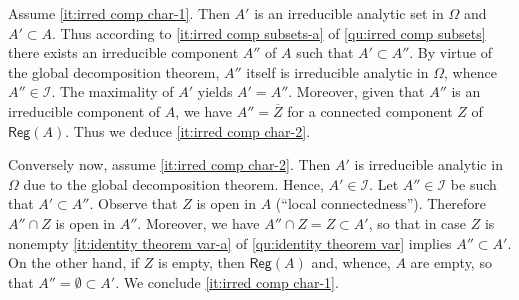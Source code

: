 \documentclass[a4paper]{amsart}
\newcommand{\C}{\mathbb{C}}
\newcommand{\Reg}[1]{\mathsf{Reg}(#1)}
\theoremstyle{remark}
\numberwithin{equation}{question}
\begin{document}
\begin{solution}
Assume \cref{it:irred comp char-1}. Then $A'$ is an irreducible analytic set in $\Omega$ and $A' \subset A$. Thus according to \cref{it:irred comp subsets-a} of \cref{qu:irred comp subsets} there exists an irreducible component $A''$ of $A$ such that $A' \subset A''$. By virtue of the global decomposition theorem, $A''$ itself is irreducible analytic in $\Omega$, whence $A'' \in \mathcal I$. The maximality of $A'$ yields $A' = A''$. Moreover, given that $A''$ is an irreducible component of $A$, we have $A'' = \overline Z$ for a connected component $Z$ of $\Reg A$. Thus we deduce \cref{it:irred comp char-2}.

Conversely now, assume \cref{it:irred comp char-2}. Then $A'$ is irreducible analytic in $\Omega$ due to the global decomposition theorem. Hence, $A' \in \mathcal I$. Let $A'' \in \mathcal I$ be such that $A' \subset A''$. Observe that $Z$ is open in $A$ (“local connectedness”). Therefore $A'' \cap Z$ is open in $A''$. Moreover, we have $A'' \cap Z = Z \subset A'$, so that in case $Z$ is nonempty \cref{it:identity theorem var-a} of \cref{qu:identity theorem var} implies $A'' \subset A'$. On the other hand, if $Z$ is empty, then $\Reg A$ and, whence, $A$ are empty, so that $A'' = \emptyset \subset A'$. We conclude \cref{it:irred comp char-1}.
\end{solution}
%
\end{document}
